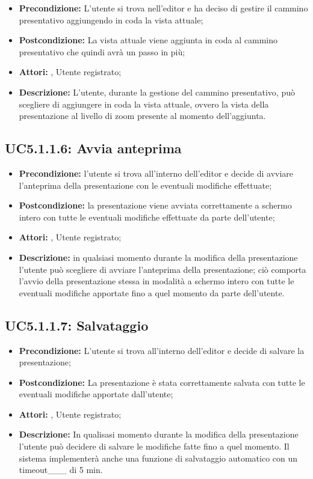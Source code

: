 \begin{itemize}
	\item \textbf{Precondizione:} L’utente si trova nell’editor e ha deciso di gestire il cammino presentativo aggiungendo in coda la vista attuale;
	\item \textbf{Postcondizione:} La vista attuale viene aggiunta in coda al cammino presentativo che quindi avrà un passo in più;
	\item \textbf{Attori:} , Utente registrato;
	\item \textbf{Descrizione:} L’utente, durante la gestione del cammino presentativo, può scegliere di aggiungere in coda la vista attuale, ovvero la vista della presentazione al livello di zoom presente al momento dell’aggiunta.
\end{itemize}
\subsection{ UC5.1.1.6: Avvia anteprima}

\begin{itemize}
	\item \textbf{Precondizione:} l’utente si trova all’interno dell’editor e decide di avviare l’anteprima della presentazione con le eventuali modifiche effettuate;
	\item \textbf{Postcondizione:} la presentazione viene avviata correttamente a schermo intero con tutte le eventuali modifiche effettuate da parte dell’utente;
	\item \textbf{Attori:} , Utente registrato;
	\item \textbf{Descrizione:} in qualsiasi momento durante la modifica della presentazione l’utente può scegliere di avviare l’anteprima della presentazione; ciò comporta l’avvio della presentazione stessa in modalità a schermo intero con tutte le eventuali modifiche apportate fino a quel momento da parte dell’utente.
\end{itemize}
\subsection{ UC5.1.1.7: Salvataggio}

\begin{itemize}
	\item \textbf{Precondizione:} L’utente si trova all’interno dell’editor e decide di salvare la presentazione;
	\item \textbf{Postcondizione:} La presentazione è stata correttamente salvata con tutte le eventuali modifiche apportate dall’utente;
	\item \textbf{Attori:} , Utente registrato;
	\item \textbf{Descrizione:} In qualisasi momento durante la modifica della presentazione l’utente può decidere di salvare le modifiche fatte fino a quel momento. Il sistema implementerà anche una funzione di salvataggio automatico con un timeout___ di 5 min.
\end{itemize}
